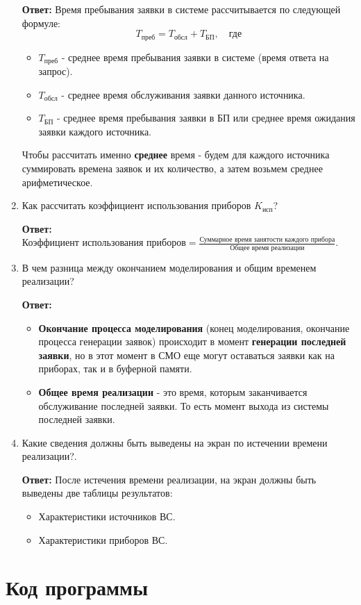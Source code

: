 \documentclass[a4paper, 14pt]{article}
\begin{document}
\begin{enumerate}
	      \textbf{Ответ:} Время пребывания заявки в системе рассчитывается по следующей формуле:
	      $$T_{\text{преб}} = T_{\text{обсл}} + T_{\text{БП}}, \quad \text{где}$$
	      \begin{itemize}
		      \item $T_{\text{преб}}$ - среднее время пребывания заявки в системе (время ответа на запрос).
		      \item $T_{\text{обсл}}$ - среднее время обслуживания заявки данного источника.
		      \item $T_{\text{БП}}$ - среднее время пребывания заявки в БП или среднее время ожидания заявки каждого источника.
	      \end{itemize}
	      Чтобы рассчитать именно \textbf{среднее} время - будем для каждого источника суммировать времена заявок и их количество, а затем возьмем среднее арифметическое.
	\item Как рассчитать коэффициент использования приборов $K_{\text{исп}}$?

	      \textbf{Ответ:} $\text{Коэффициент использования приборов} = \frac{\text{Суммарное время занятости каждого прибора}}{\text{Общее время реализации}}$.
	\item В чем разница между окончанием моделирования и общим временем реализации?

	      \textbf{Ответ:}
	      \begin{itemize}
		      \item \textbf{Окончание процесса моделирования} (конец моделирования, окончание процесса генерации заявок) происходит в момент \textbf{генерации последней заявки}, но в этот момент в СМО еще могут оставаться заявки как на приборах, так и в буферной памяти.
		      \item \textbf{Общее время реализации} - это время, которым заканчивается обслуживание последней заявки. То есть момент выхода из системы последней заявки.
	      \end{itemize}
	\item Какие сведения должны быть выведены на экран по истечении времени реализации?.

	      \textbf{Ответ:} После истечения времени реализации, на экран должны быть выведены две таблицы результатов:
	      \begin{itemize}
		      \item Характеристики источников ВС.
		      \item Характеристики приборов ВС.
	      \end{itemize}
\end{enumerate}

\section{Код программы}
\end{document}
